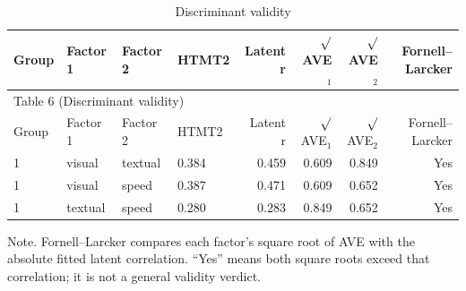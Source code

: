 \documentclass[11pt]{article}
\begin{document}
\begin{landscape}
\small
\begin{longtable}{llllrrrr}
\caption{Discriminant validity}\\
\toprule
Group & Factor 1 & Factor 2 & HTMT2 & Latent r & $\surd$AVE$_{1}$ & $\surd$AVE$_{2}$ & Fornell–Larcker \\
\midrule
\endfirsthead
\multicolumn{8}{l}{Table 6 (Discriminant validity)} \\
\toprule
Group & Factor 1 & Factor 2 & HTMT2 & Latent r & $\surd$AVE$_{1}$ & $\surd$AVE$_{2}$ & Fornell–Larcker \\
\midrule
\endhead
1 & visual & textual & 0.384 & 0.459 & 0.609 & 0.849 & Yes \\
1 & visual & speed & 0.387 & 0.471 & 0.609 & 0.652 & Yes \\
1 & textual & speed & 0.280 & 0.283 & 0.849 & 0.652 & Yes \\
\bottomrule
\end{longtable}
\noindent Note. Fornell–Larcker compares each factor's square root of AVE with the absolute fitted latent correlation. “Yes” means both square roots exceed that correlation; it is not a general validity verdict.\par
\end{landscape}
\end{document}
